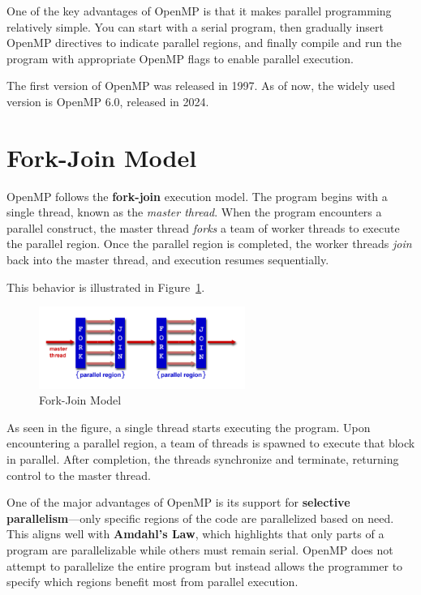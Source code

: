 \documentclass[12pt]{book}
\begin{document}
One of the key advantages of OpenMP is that it makes parallel programming relatively simple. You can start with a serial program, then gradually insert OpenMP directives to indicate parallel regions, and finally compile and run the program with appropriate OpenMP flags to enable parallel execution.

The first version of OpenMP was released in 1997. As of now, the widely used version is OpenMP 6.0, released in 2024.


\section{Fork-Join Model}

OpenMP follows the \textbf{fork-join} execution model. The program begins with a single thread, known as the \textit{master thread}. When the program encounters a parallel construct, the master thread \textit{forks} a team of worker threads to execute the parallel region. Once the parallel region is completed, the worker threads \textit{join} back into the master thread, and execution resumes sequentially.

This behavior is illustrated in Figure~\ref{fig:forkjoin}.

\begin{figure}[H]
    \centering
    \includegraphics[width=0.6\textwidth]{images/forkjoin.png}
    \caption{Fork-Join Model}
    \label{fig:forkjoin}
\end{figure}

As seen in the figure, a single thread starts executing the program. Upon encountering a parallel region, a team of threads is spawned to execute that block in parallel. After completion, the threads synchronize and terminate, returning control to the master thread.

One of the major advantages of OpenMP is its support for \textbf{selective parallelism}—only specific regions of the code are parallelized based on need. This aligns well with \textbf{Amdahl's Law}, which highlights that only parts of a program are parallelizable while others must remain serial. OpenMP does not attempt to parallelize the entire program but instead allows the programmer to specify which regions benefit most from parallel execution.
\end{document}
